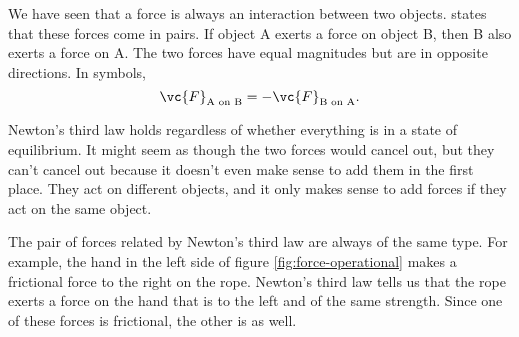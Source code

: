 We have seen that a force is always an interaction between two objects.
states that these forces come in pairs. If object A exerts a
force on object B, then B also exerts a force on A.
The two forces have equal magnitudes but are in opposite directions.
In symbols,
\begin{equation}
  \vc{F}_\text{A on B} = -  \vc{F}_\text{B on A}.
\end{equation}

Newton's third law holds regardless of whether everything is
in a state of equilibrium. It might seem as though the two forces
would cancel out, but they can't cancel out because it doesn't
even make sense to add them in the first place. They act on different
objects, and it only makes sense to add forces if they act on the
same object.


The pair of forces related by Newton's third law are always of the
same type. For example, 
the hand in the left side of figure \ref{fig:force-operational}
makes a frictional force to the right on the rope. Newton's third law
tells us that the rope exerts a force on the hand that is to the
left and of the same strength. Since one of these forces is frictional,
the other is as well.
